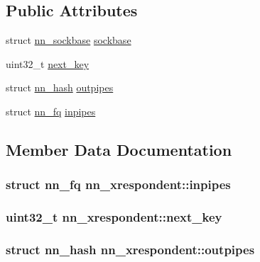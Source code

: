 \subsection*{Public Attributes}
\begin{DoxyCompactItemize}
\item 
struct \hyperlink{structnn__sockbase}{nn\+\_\+sockbase} \hyperlink{structnn__xrespondent_a9d4a5e23b78a1dbb272cf42f414ec7e6}{sockbase}
\item 
uint32\+\_\+t \hyperlink{structnn__xrespondent_abb9a895daa3e095d6cdeb60932854e87}{next\+\_\+key}
\item 
struct \hyperlink{structnn__hash}{nn\+\_\+hash} \hyperlink{structnn__xrespondent_a00fdec4f4ed570813fb676907b13a5d0}{outpipes}
\item 
struct \hyperlink{structnn__fq}{nn\+\_\+fq} \hyperlink{structnn__xrespondent_a09d1cbe7517e1d3306add4f8334b7600}{inpipes}
\end{DoxyCompactItemize}


\subsection{Member Data Documentation}
\subsubsection[{inpipes}]{\setlength{\rightskip}{0pt plus 5cm}struct {\bf nn\+\_\+fq} nn\+\_\+xrespondent\+::inpipes}\hypertarget{structnn__xrespondent_a09d1cbe7517e1d3306add4f8334b7600}{}\label{structnn__xrespondent_a09d1cbe7517e1d3306add4f8334b7600}
\subsubsection[{next\+\_\+key}]{\setlength{\rightskip}{0pt plus 5cm}uint32\+\_\+t nn\+\_\+xrespondent\+::next\+\_\+key}\hypertarget{structnn__xrespondent_abb9a895daa3e095d6cdeb60932854e87}{}\label{structnn__xrespondent_abb9a895daa3e095d6cdeb60932854e87}
\subsubsection[{outpipes}]{\setlength{\rightskip}{0pt plus 5cm}struct {\bf nn\+\_\+hash} nn\+\_\+xrespondent\+::outpipes}\hypertarget{structnn__xrespondent_a00fdec4f4ed570813fb676907b13a5d0}{}\label{structnn__xrespondent_a00fdec4f4ed570813fb676907b13a5d0}
